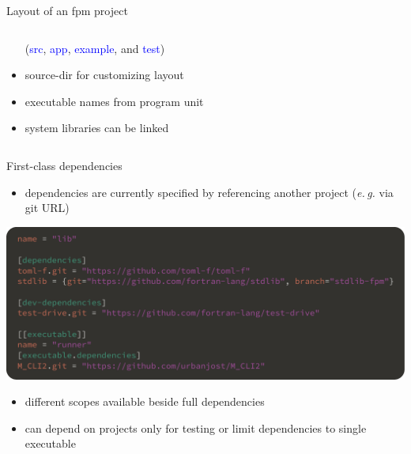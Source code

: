 \documentclass[lualatex,10pt,aspectratio=169]{beamer}
\begin{document}
\begin{frame}{Layout of an fpm project}
\begin{columns}
\begin{column}{.45\textwidth}
\begin{itemize}
               (\textcolor{blue}{src}, \textcolor{blue}{app}, \textcolor{blue}{example}, and \textcolor{blue}{test})
            \item \alert{source-dir} for customizing layout
               \\[2ex]
            \item executable names from \alert{program} unit
               \\[2ex]
            \item system libraries can be linked
               \\[2ex]
         \end{itemize}
      \end{column}
   \end{columns}
\end{frame}

\begin{frame}{First-class dependencies}
   \begin{itemize}
      \item dependencies are currently specified by referencing another project
         (\textit{e.\,g.} via git URL)
   \end{itemize}

   \begin{center}
      \includegraphics[width=.85\textwidth]{Figures/dependencies.pdf}
   \end{center}

   \begin{itemize}
      \item different scopes available beside full dependencies
      \item can depend on projects only for testing or limit dependencies to single executable
   \end{itemize}
\end{frame}
\end{document}
